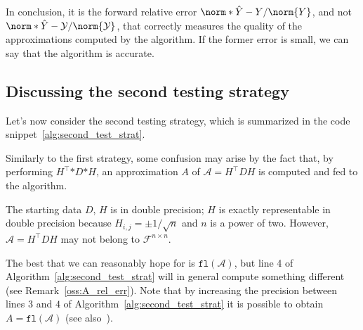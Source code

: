In conclusion, it is the forward relative error $\norm*{\hat{Y}-Y}/\norm{Y}$, and not $\norm*{\hat{Y}-\mathcal{Y}}/\norm{\mathcal{Y}}$, that correctly measures the quality of the approximations computed by the algorithm. If the former error is small, we can say that the algorithm is accurate. 

%	

\subsection{Discussing the second testing strategy}
Let's now consider the second testing strategy, which is summarized in the code snippet~\ref{alg:second_test_strat}.

Similarly to the first strategy, some confusion may arise by the fact that, by performing $H^{\top}\!\mathtt{*}D\mathtt{*}H$, an approximation $A$ of $\mathcal{A}=H^{\top}\!DH$ is computed and fed to the algorithm.

\begin{oss}\label{oss:A_double_prec}
	The starting data $D$, $H$ is in double precision; $H$ is exactly representable in double precision because $H_{i,j}=\pm 1/\sqrt{n}$ and $n$ is a power of two. 	
	However, $\mathcal{A}=H^{\top}DH$ may not belong to $\mathcal{F}^{n\times n}$.
	
	The best that we can reasonably hope for is $\mathtt{fl}(\mathcal{A})$, but line 4 of Algorithm~\ref{alg:second_test_strat} will in general compute something different (see Remark~\ref{oss:A_rel_err}). Note that by increasing the precision between lines $3$ and $4$ of Algorithm~\ref{alg:second_test_strat} it is possible to obtain $A=\mathtt{fl}(\mathcal{A})$ (see also~\cite[p.64]{higham:accuracy_book}).
\end{oss}

